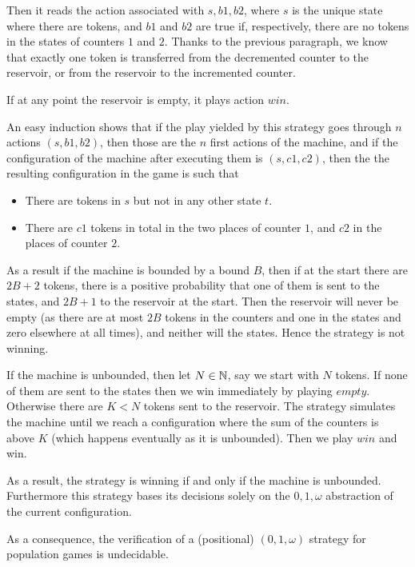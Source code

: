 \documentclass{article}
\begin{document}
Then it reads the action associated with $s, b1, b2$, where $s$ is the unique state where there are tokens, and $b1$ and $b2$ are true if, respectively, there are no tokens in the states of counters $1$ and $2$. Thanks to the previous paragraph, we know that exactly one token is transferred from the decremented counter to the reservoir, or from the reservoir to the incremented counter.

If at any point the reservoir is empty, it plays action $win$.

An easy induction shows that if the play yielded by this strategy goes through $n$ actions $(s,b1, b2)$, then those are the $n$ first actions of the machine, and if the configuration of the machine after executing them is $(s, c1, c2)$, then the the resulting configuration in the game is such that 
\begin{itemize}
	\item There are tokens in $s$ but not in any other state $t$.
	
	\item There are $c1$ tokens in total in the two places of counter $1$, and $c2$ in the places of counter $2$.
\end{itemize}

As a result if the machine is bounded by a bound $B$, then if at the start there are $2B + 2$ tokens, there is a positive probability that one of them is sent to the states, and $2B+1$ to the reservoir at the start. Then the reservoir will never be empty (as there are at most $2B$ tokens in the counters and one in the states and zero elsewhere at all times), and neither will the states. Hence the strategy is not winning.

If the machine is unbounded, then let $N \in \mathbb{N}$, say we start with $N$ tokens.
If none of them are sent to the states then we win immediately by playing $empty$.
Otherwise there are $K < N$ tokens sent to the reservoir. The strategy simulates the machine until we reach a configuration where the sum of the counters is above $K$ (which happens eventually as it is unbounded). Then we play $win$ and win.

As a result, the strategy is winning if and only if the machine is unbounded.
Furthermore this strategy bases its decisions solely on the $0, 1, \omega$ abstraction of the current configuration.

As a consequence, the verification of a (positional) $(0, 1, \omega)$ strategy for population games is undecidable.

	
\end{document}
